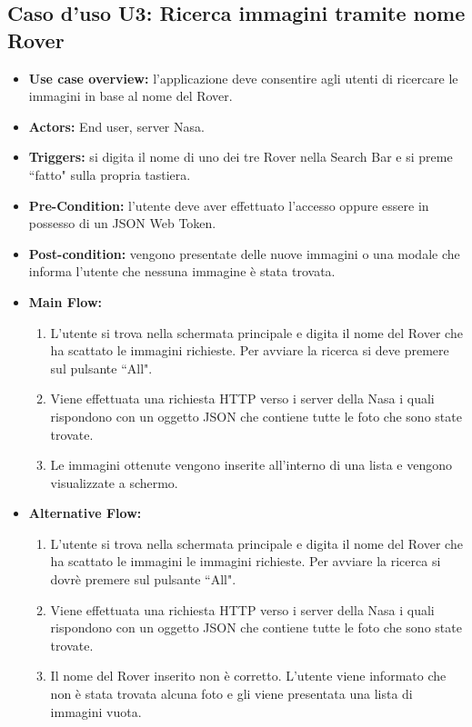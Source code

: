 \subsection*{Caso d'uso U3: Ricerca immagini tramite nome Rover}
\begin{itemize}
    \item  \textbf{Use case overview:} l'applicazione deve consentire agli utenti di ricercare le immagini in base al nome del Rover.
    \item \textbf{Actors:} End user, server Nasa.
    \item \textbf{Triggers:} si digita il nome di uno dei tre Rover nella Search Bar e si preme ``fatto" sulla propria tastiera.
    \item \textbf{Pre-Condition:} l'utente deve aver effettuato l'accesso oppure essere in possesso di un JSON Web Token.
    \item \textbf{Post-condition:} vengono presentate delle nuove immagini o una modale che informa l'utente che nessuna immagine \`e stata trovata.
    \item \textbf{Main Flow:} \begin{enumerate}
              \item L'utente si trova nella schermata principale e digita il nome del Rover che ha scattato le immagini richieste. Per avviare la ricerca si deve premere sul pulsante ``All".
              \item Viene effettuata una richiesta HTTP verso i server della Nasa i quali rispondono con un oggetto JSON che contiene tutte le foto che sono state trovate.
              \item Le immagini ottenute vengono inserite all'interno di una lista e vengono visualizzate a schermo.

          \end{enumerate}
    \item \textbf{Alternative Flow:}\begin{enumerate}
              \item L'utente si trova nella schermata principale e digita il nome del Rover che ha scattato le immagini le immagini richieste. Per avviare la ricerca si dovr\`e premere sul pulsante ``All".
              \item Viene effettuata una richiesta HTTP verso i server della Nasa i quali rispondono con un oggetto JSON che contiene tutte le foto che sono state trovate.
              \item Il nome del Rover inserito non \`e corretto. L'utente viene informato che non \`e stata trovata alcuna foto e gli viene presentata una lista di immagini vuota.

          \end{enumerate}
\end{itemize}
